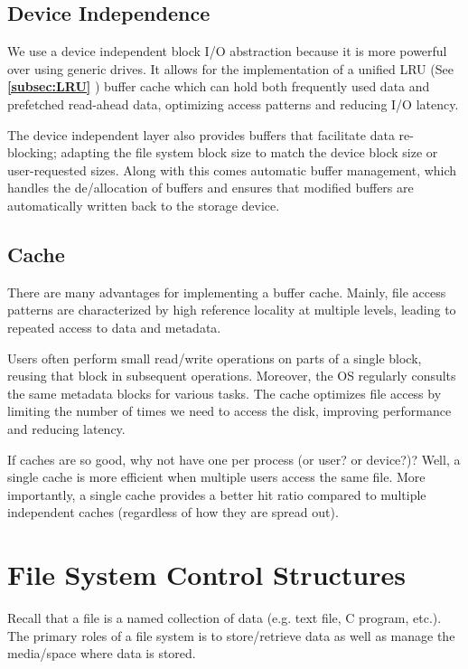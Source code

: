 \documentclass{report}
\newcommand{\corollaryBegin}[1]{\begin{tcolorbox}[colback=teal!5!white,colframe=black!75!teal,title={Corollary:
      #1}]}
\newcommand{\corollaryEnd}{\end{tcolorbox}}
\newcommand{\refto}[2]{\textbf{\ref{#1:#2} \nameref{#1:#2}}}
\begin{document}
\subsection{Device Independence}
We use a device independent block I/O abstraction because it is more powerful over using generic
drives. It allows for the implementation of a unified LRU (See \refto{subsec}{LRU}) buffer cache
which can hold both frequently used data and prefetched read-ahead data, optimizing access patterns
and reducing I/O latency.

The device independent layer also provides buffers that facilitate data re-blocking; adapting the
file system block size to match the device block size or user-requested sizes. Along with this comes
automatic buffer management, which handles the de/allocation of buffers and ensures that modified
buffers are automatically written back to the storage device.


\subsection{Cache}
There are many advantages for implementing a buffer cache. Mainly, file access patterns are characterized by
high reference locality at multiple levels, leading to repeated access to data and
metadata.

Users often perform small read/write operations on parts of a single block, reusing that block in
subsequent operations. Moreover, the OS regularly consults the same metadata blocks for various
tasks. The cache optimizes file access by limiting the number of times we need to access the disk,
improving performance and reducing latency.

\corollaryBegin{Single Cache}
If caches are so good, why not have one per process (or user? or device?)? Well, a single cache is
more efficient when multiple users access the same file. More importantly, a single cache provides a
better hit ratio compared to multiple independent caches (regardless of how they are spread
out).
\corollaryEnd





\section{File System Control Structures}
Recall that a file is a named collection of data (e.g. text file, C program, etc.). The primary
roles of a file system is to store/retrieve data as well as manage the media/space where data is
stored.
\end{document}
